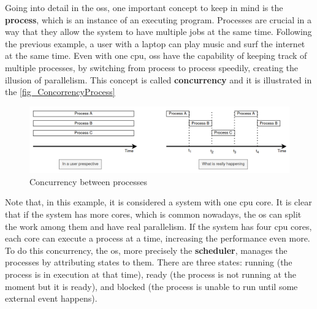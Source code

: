 

Going into detail in the \glspl{os}, one important concept to keep in mind is the \textbf{process}, which is an instance of an executing 
program. Processes are crucial in a way that they allow the system to have multiple jobs at the same time. Following the previous example, a 
user with a laptop can play music and surf the internet at the same time. Even with one \gls{cpu}, \glspl{os} have the capability of keeping 
track of multiple processes, by switching from process to process speedily, creating the illusion of parallelism. This concept is called 
\textbf{concurrency} and it is illustrated in the \autoref{fig_ConcorrencyProcess}

\begin{figure}[H]
	\centering
 	\includegraphics[width=1\linewidth]{Images/ConcorrencyProcess.png}
 	\caption{ Concurrency between processes }
	 \label{fig_ConcorrencyProcess}
\end{figure}

Note that, in this example, it is considered a system with one \gls{cpu} core. It is clear that if the system has more cores, which is common 
nowadays, the \gls{os} can split the work among them and have real parallelism. If the system has four \gls{cpu} cores, each core can execute a 
process at a time, increasing the performance even more. To do this concurrency, the \gls{os}, more precisely the \textbf{scheduler}, manages the 
processes by attributing states to them. There are three states: running (the process is in execution at that time), ready (the process is not 
running at the moment but it is ready), and blocked (the process is unable to run until some external event happens). 

